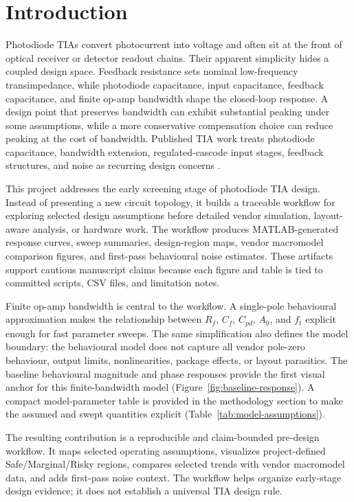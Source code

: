 \section{Introduction}

Photodiode TIAs convert photocurrent into voltage and often sit at the front of optical receiver or detector readout chains. Their apparent simplicity hides a coupled design space. Feedback resistance sets nominal low-frequency transimpedance, while photodiode capacitance, input capacitance, feedback capacitance, and finite op-amp bandwidth shape the closed-loop response. A design point that preserves bandwidth can exhibit substantial peaking under some assumptions, while a more conservative compensation choice can reduce peaking at the cost of bandwidth. Published TIA work treats photodiode capacitance, bandwidth extension, regulated-cascode input stages, feedback structures, and noise as recurring design concerns \citep{ANALUI_2004_BW_ENHANCEMENT,LU_2007_BROADBAND_TIA,PARK_YOO_2004_RGC_TIA,NOH_2020_CF_TIA_DC_LOOP}.

This project addresses the early screening stage of photodiode TIA design. Instead of presenting a new circuit topology, it builds a traceable workflow for exploring selected design assumptions before detailed vendor simulation, layout-aware analysis, or hardware work. The workflow produces MATLAB-generated response curves, sweep summaries, design-region maps, vendor macromodel comparison figures, and first-pass behavioural noise estimates. These artifacts support cautious manuscript claims because each figure and table is tied to committed scripts, CSV files, and limitation notes.

Finite op-amp bandwidth is central to the workflow. A single-pole behavioural approximation makes the relationship between $R_f$, $C_f$, $C_{pd}$, $A_0$, and $f_t$ explicit enough for fast parameter sweeps. The same simplification also defines the model boundary: the behavioural model does not capture all vendor pole-zero behaviour, output limits, nonlinearities, package effects, or layout parasitics. The baseline behavioural magnitude and phase responses provide the first visual anchor for this finite-bandwidth model (Figure~\ref{fig:baseline-response}). A compact model-parameter table is provided in the methodology section to make the assumed and swept quantities explicit (Table~\ref{tab:model-assumptions}).

The resulting contribution is a reproducible and claim-bounded pre-design workflow. It maps selected operating assumptions, visualizes project-defined Safe/Marginal/Risky regions, compares selected trends with vendor macromodel data, and adds first-pass noise context. The workflow helps organize early-stage design evidence; it does not establish a universal TIA design rule.
